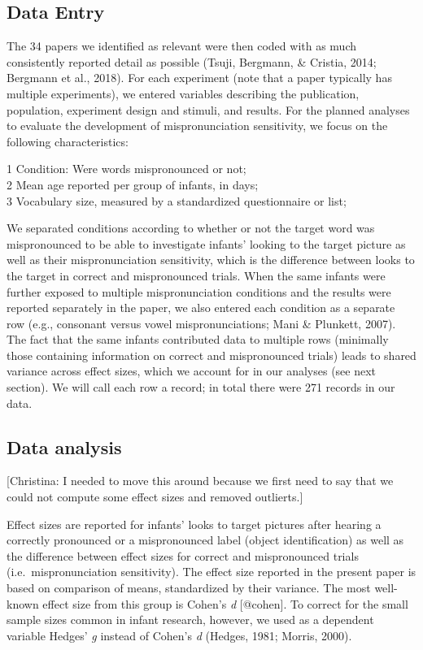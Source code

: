 \documentclass[man]{apa6}
\theoremstyle{definition}
\theoremstyle{definition}
\theoremstyle{definition}
\theoremstyle{remark}
\begin{document}
\subsection{Data Entry}\label{data-entry}

The 34 papers we identified as relevant were then coded with as much
consistently reported detail as possible (Tsuji, Bergmann, \& Cristia,
2014; Bergmann et al., 2018). For each experiment (note that a paper
typically has multiple experiments), we entered variables describing the
publication, population, experiment design and stimuli, and results. For
the planned analyses to evaluate the development of mispronunciation
sensitivity, we focus on the following characteristics:

1 Condition: Were words mispronounced or not;\\
2 Mean age reported per group of infants, in days;\\
3 Vocabulary size, measured by a standardized questionnaire or list;

We separated conditions according to whether or not the target word was
mispronounced to be able to investigate infants' looking to the target
picture as well as their mispronunciation sensitivity, which is the
difference between looks to the target in correct and mispronounced
trials. When the same infants were further exposed to multiple
mispronunciation conditions and the results were reported separately in
the paper, we also entered each condition as a separate row (e.g.,
consonant versus vowel mispronunciations; Mani \& Plunkett, 2007). The
fact that the same infants contributed data to multiple rows (minimally
those containing information on correct and mispronounced trials) leads
to shared variance across effect sizes, which we account for in our
analyses (see next section). We will call each row a record; in total
there were 271 records in our data.

\subsection{Data analysis}\label{data-analysis}

{[}Christina: I needed to move this around because we first need to say
that we could not compute some effect sizes and removed outlierts.{]}

Effect sizes are reported for infants' looks to target pictures after
hearing a correctly pronounced or a mispronounced label (object
identification) as well as the difference between effect sizes for
correct and mispronounced trials (i.e.~mispronunciation sensitivity).
The effect size reported in the present paper is based on comparison of
means, standardized by their variance. The most well-known effect size
from this group is Cohen's \emph{d} {[}@cohen{]}. To correct for the
small sample sizes common in infant research, however, we used as a
dependent variable Hedges' \emph{g} instead of Cohen's \emph{d} (Hedges,
1981; Morris, 2000).
\end{document}
